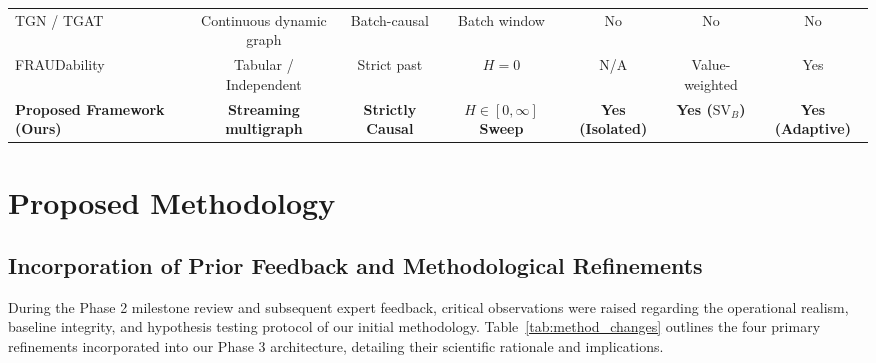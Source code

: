 \documentclass[pdflatex,sn-mathphys,Numbered]{sn-jnl}
\renewenvironment{table*}[1][!htbp]{\begin{tableorg}[#1]\begin{center}\tablebodyfont}{\end{center}\end{tableorg}}
\theoremstyle{thmstyleone}
\theoremstyle{thmstyletwo}
\theoremstyle{thmstylethree}
\begin{document}
\begin{table}[!htbp]
{\begin{tabular}{lcccccc}
TGN / TGAT~\cite{rossi2020tgn,xu2020tgat} & Continuous dynamic graph & Batch-causal & Batch window & No & No & No \\
FRAUDability~\cite{doytshman2023fraudability} & Tabular / Independent & Strict past & $H=0$ & N/A & Value-weighted & Yes \\
\midrule
\textbf{Proposed Framework (Ours)} & \textbf{Streaming multigraph} & \textbf{Strictly Causal} & \textbf{$H \in [0, \infty]$ Sweep} & \textbf{Yes (Isolated)} & \textbf{Yes ($\text{SV}_B$)} & \textbf{Yes (Adaptive)} \\
\bottomrule
\end{tabular}%
}
\end{table}

\section{Proposed Methodology}
\label{sec:methodology}

\subsection{Incorporation of Prior Feedback and Methodological Refinements}
During the Phase 2 milestone review and subsequent expert feedback, critical observations were raised regarding the operational realism, baseline integrity, and hypothesis testing protocol of our initial methodology. Table~\ref{tab:method_changes} outlines the four primary refinements incorporated into our Phase 3 architecture, detailing their scientific rationale and implications.
\end{document}
